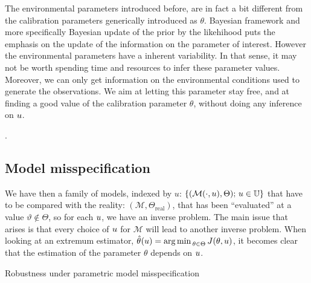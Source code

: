 \documentclass[../../Main_ManuscritThese.tex]{subfiles}
\begin{document}
The environmental parameters introduced before, are in fact a bit different from the calibration parameters generically introduced as $\theta$. Bayesian framework and more specifically Bayesian update of the prior by the likehihood puts the emphasis on the update of the information on the parameter of interest. However the environmental parameters have a inherent variability. In that sense, it may not be worth spending time and resources to infer these parameter values. Moreover, we can only get information on the environmental conditions used to generate the observations.
We aim at letting this parameter stay free, and at finding a good value of the calibration parameter $\theta$, without doing any inference on $u$.


\cite{andreassian_all_2012} \cite{kuczera_there_2010}.

\subsection{Model misspecification}

We have then a family of models, indexed by $u$: $\{(\mathcal{M}(\cdot,u) , \Theta);\, u \in \mathbb{U}\}$ that have to be compared with the reality: $(\mathscr{M}, \Theta_{\mathrm{real}})$, that has been ``evaluated'' at a value $\vartheta \notin \Theta$, so for each $u$, we have an inverse problem.
The main issue that arises is that every choice of $u$ for $\mathcal{M}$ will lead to another inverse problem. When looking at an extremum estimator, $\hat{\theta}_{\mathrm{}}(u) = \operatorname*{arg\,min \,}_{\theta \in \Theta} J(\theta,u)$, it becomes clear that the estimation of the parameter $\theta$ depends on $u$.


Robustness under parametric model misspecification


\subfileLocal{
	\pagestyle{empty}
	
	
}
\end{document}
